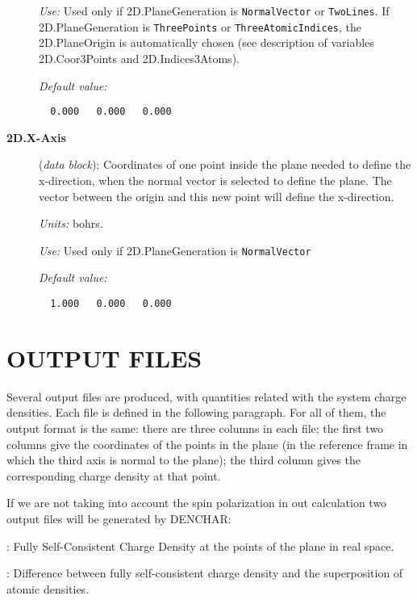 \begin{description}
{\it Use:} Used only if 2D.PlaneGeneration is {\tt NormalVector} or
{\tt TwoLines}. If 2D.PlaneGeneration is {\tt ThreePoints}
or {\tt ThreeAtomicIndices}, the 2D.PlaneOrigin is
automatically chosen (see description of variables 2D.Coor3Points
and 2D.Indices3Atoms).
    
{\it Default value:} 
\begin{verbatim}
  0.000   0.000   0.000
\end{verbatim}
        
\item[{\bf 2D.X-Axis}] ({\it data block}): 
Coordinates of one point inside the plane needed to define the x-direction,
when the normal vector is selected to define the plane. The vector between 
the origin and this new point will define the x-direction.

{\it Units:} bohrs.

{\it Use:} Used only if 2D.PlaneGeneration is {\tt NormalVector} 
    
{\it Default value:} 
\begin{verbatim}
  1.000   0.000   0.000
\end{verbatim}

\end{description}

\section{OUTPUT FILES}

Several output files are produced, with quantities related
with the system charge densities.
Each file is defined in the following paragraph.
For all of them, the output format is the same: there are three 
columns in each file; the first two columns give the coordinates of the points
in the plane (in the reference frame in which the third axis is normal  
to the plane);
the third column gives the corresponding charge density at that
point.

If we are not taking into account the spin polarization in out calculation 
two output files will be generated by DENCHAR:

\begin{description}
\itemsep 10pt
\parsep 0pt

\item[{\bf {\it SystemLabel}.CON.SCF}]: 
Fully Self-Consistent Charge Density at the points of the plane in real space.

\item[{\bf {\it SystemLabel}.CON.DEL}]: 
Difference between fully self-consistent charge density and the superposition
of atomic densities. 
 
\end{description}

